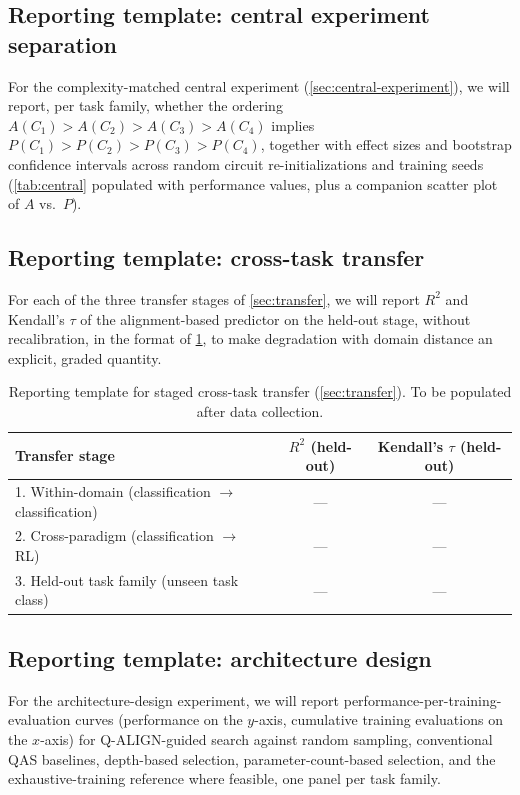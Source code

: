 \documentclass[11pt]{article}
\begin{document}
\subsection{Reporting template: central experiment separation}
For the complexity-matched central experiment (\cref{sec:central-experiment}), we will report, per task family, whether the ordering $A(C_1)>A(C_2)>A(C_3)>A(C_4)$ implies $P(C_1)>P(C_2)>P(C_3)>P(C_4)$, together with effect sizes and bootstrap confidence intervals across random circuit re-initializations and training seeds (\cref{tab:central} populated with performance values, plus a companion scatter plot of $A$ vs.\ $P$).

\subsection{Reporting template: cross-task transfer}
For each of the three transfer stages of \cref{sec:transfer}, we will report $R^2$ and Kendall's $\tau$ of the alignment-based predictor on the held-out stage, without recalibration, in the format of \cref{tab:transfer-template}, to make degradation with domain distance an explicit, graded quantity.

\begin{table}[htbp]
\centering
\caption{Reporting template for staged cross-task transfer (\cref{sec:transfer}). To be populated after data collection.}
\label{tab:transfer-template}
\begin{tabular}{@{}lcc@{}}
\toprule
Transfer stage & $R^2$ (held-out) & Kendall's $\tau$ (held-out) \\
\midrule
1. Within-domain (classification $\to$ classification) & --- & --- \\
2. Cross-paradigm (classification $\to$ RL) & --- & --- \\
3. Held-out task family (unseen task class) & --- & --- \\
\bottomrule
\end{tabular}
\end{table}

\subsection{Reporting template: architecture design}
For the architecture-design experiment, we will report performance-per-training-evaluation curves (performance on the $y$-axis, cumulative training evaluations on the $x$-axis) for Q-ALIGN-guided search against random sampling, conventional QAS baselines, depth-based selection, parameter-count-based selection, and the exhaustive-training reference where feasible, one panel per task family.
\end{document}
